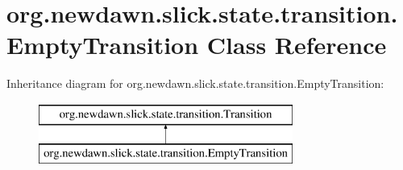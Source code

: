 \hypertarget{classorg_1_1newdawn_1_1slick_1_1state_1_1transition_1_1_empty_transition}{}\section{org.\+newdawn.\+slick.\+state.\+transition.\+Empty\+Transition Class Reference}
\label{classorg_1_1newdawn_1_1slick_1_1state_1_1transition_1_1_empty_transition}
Inheritance diagram for org.\+newdawn.\+slick.\+state.\+transition.\+Empty\+Transition\+:\begin{figure}[H]
\begin{center}
\leavevmode
\includegraphics[height=2.000000cm]{classorg_1_1newdawn_1_1slick_1_1state_1_1transition_1_1_empty_transition}
\end{center}
\end{figure}
